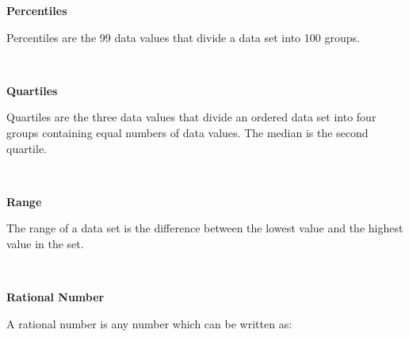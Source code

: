 \begin{description}
	    {\bf  Percentiles }\\\begin{description}\item{\hspace{.3cm}}\hspace{.3cm}
          \label{m39400*id214611}Percentiles are the 99 data values that divide a data set into 100 groups. \par 
          \\\end{description}
	    \vspace{.3cm}
	    \item[{\large \bfseries Q}]\noindent\raggedright
	    {\bf  Quartiles }\\\begin{description}\item{\hspace{.3cm}}\hspace{.3cm}
          \label{m39400*id212998}Quartiles are the three data values that divide an ordered data set into four groups containing equal numbers of data values. The median is the second quartile. \par 
          \\\end{description}
	    \vspace{.3cm}
	    \item[{\large \bfseries R}]\noindent\raggedright
	    {\bf  Range }\\\begin{description}\item{\hspace{.3cm}}\hspace{.3cm}
          \label{m39400*id212688}The range of a data set is the difference between the lowest value and the highest value in the set. \par 
          \\\end{description}
	    \item[] \noindent\raggedright {\bf  Rational Number }\\\begin{description}\item{\hspace{.3cm}}\hspace{.3cm}
      \label{m38348*id62709}A rational number is any number which can be written as:\par 
      \label{m38348*uid6}\nopagebreak\noindent{}
        \settowidth{\mymathboxwidth}{\begin{equation}

\end{equation}}
\end{description}
\end{description}
